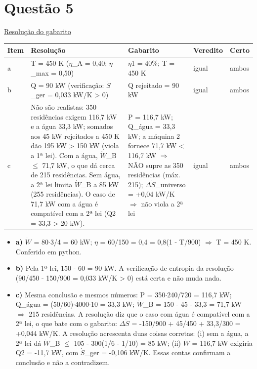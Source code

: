 \documentclass{article}%
\begin{document}
\section*{Questão 5}%
\href{https://poliedroresolve.sistemapoliedro.com.br/vestibulares/ime/2027/ime-2-fase-dia-2-27-10-2026-2-fase-dia-2/dissertativa-5-fisica-2-fase-dia-2-ime-2027}{Resolução do gabarito}\par\smallskip%
\begin{longtable}{@{}p{} p{} p{} p{} p{}@{}}\toprule Item & Resolução & Gabarito & Veredito & Certo \\ \midrule
a & T = 450 K ($\eta$\_A = 0,40; $\eta$\_max = 0,50) & $\eta$1 = 40\%; T = 450 K & igual & ambos \\
b & Q = 90 kW (verificação: $\dot S$\_ger = 0,033 kW/K > 0) & Q rejeitado = 90 kW & igual & ambos \\
c & Não são realistas: 350 residências exigem 116,7 kW e a água 33,3 kW; somados aos 45 kW rejeitados a 450 K dão 195 kW > 150 kW (viola a 1ª lei). Com a água, $\dot W$\_B $\leq$ 71,7 kW, o que dá cerca de 215 residências. Sem água, a 2ª lei limita $\dot W$\_B a 85 kW (255 residências). O caso de 71,7 kW com a água é compatível com a 2ª lei (Q2 = 33,3 > 20 kW). & P = 116,7 kW; Q\_água = 33,3 kW; a máquina 2 fornece 71,7 kW < 116,7 kW $\Rightarrow$ NÃO supre as 350 residências (máx. 215); $\Delta$$\dot S$\_universo = +0,04 kW/K $\Rightarrow$ não viola a 2ª lei & igual & ambos \\
\bottomrule\end{longtable}%
\begin{itemize}%
\item%
\textbf{a)} $\dot W$ = 80$\cdot$3/4 = 60 kW; $\eta$ = 60/150 = 0,4 = 0,8(1 - T/900) $\Rightarrow$ T = 450 K. Conferido em python.%
\item%
\textbf{b)} Pela 1ª lei, 150 - 60 = 90 kW. A verificação de entropia da resolução (90/450 - 150/900 = 0,033 kW/K > 0) está certa e não muda nada.%
\item%
\textbf{c)} Mesma conclusão e mesmos números: P = 350$\cdot$240/720 = 116,7 kW; Q\_água = (50/60)$\cdot$4000$\cdot$10 = 33,3 kW; $\dot W$\_B = 150 - 45 - 33,3 = 71,7 kW $\Rightarrow$ 215 residências. A resolução diz que o caso com água é compatível com a 2ª lei, o que bate com o gabarito: $\Delta$$\dot S$ = -150/900 + 45/450 + 33,3/300 = +0,044 kW/K. A resolução acrescenta duas coisas corretas: (i) sem a água, a 2ª lei dá $\dot W$\_B $\leq$ 105 - 300(1/6 - 1/10) = 85 kW; (ii) $\dot W$ = 116,7 kW exigiria Q2 = -11,7 kW, com $\dot S$\_ger = -0,106 kW/K. Essas contas confirmam a conclusão e não a contradizem.%
\end{itemize}%
\end{document}
